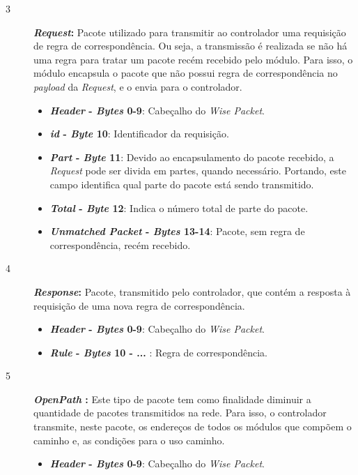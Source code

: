 \begin{description}
\begin{itemize}
        \end{itemize}
    \item [3]\textbf{\textit{Request}:} Pacote utilizado para transmitir ao controlador uma requisição de regra de correspondência. Ou seja, a transmissão é realizada se não há uma regra para tratar um pacote recém recebido pelo módulo. Para isso, o módulo encapsula o pacote que não possui regra de correspondência no \textit{payload} da \textit{Request}, e o envia para o controlador. 
        \begin{itemize} 
            \item \textbf{\textit{Header} - \textit{Bytes} 0-9}: Cabeçalho do \textit{ Wise Packet}.
            \item \textbf{\textit{id} - \textit{Byte} 10}: Identificador da requisição.
            \item \textbf{\textit{Part} - \textit{Byte} 11}: Devido ao encapsulamento do pacote recebido, a \textit{Request} pode ser divida em partes, quando necessário. Portando, este campo identifica qual parte do pacote está sendo transmitido. 
            \item \textbf{\textit{Total} - \textit{Byte} 12}: Indica o número total de parte do pacote.
            \item \textbf{\textit{Unmatched Packet} - \textit{Bytes} 13-14}: Pacote, sem regra de correspondência, recém recebido.
        \end{itemize}
    \item [4]\textbf{\textit{Response}:} Pacote, transmitido pelo controlador, que contém a resposta à requisição de uma nova regra de correspondência.
        \begin{itemize} 
            \item \textbf{\textit{Header} - \textit{Bytes} 0-9}: Cabeçalho do \textit{ Wise Packet}.
            \item \textbf{\textit{Rule} - \textit{Bytes} 10 - ... }: Regra de correspondência.
        \end{itemize}
    \item [5]\textbf{\textit{OpenPath }:} Este tipo de pacote tem como finalidade diminuir a quantidade de pacotes transmitidos na rede. Para isso, o controlador transmite, neste pacote, os endereços de todos os módulos que compõem o caminho e, as condições para o uso caminho.
        \begin{itemize} 
            \item \textbf{\textit{Header} - \textit{Bytes} 0-9}: Cabeçalho do \textit{ Wise Packet}.

\end{itemize}
\end{description}
